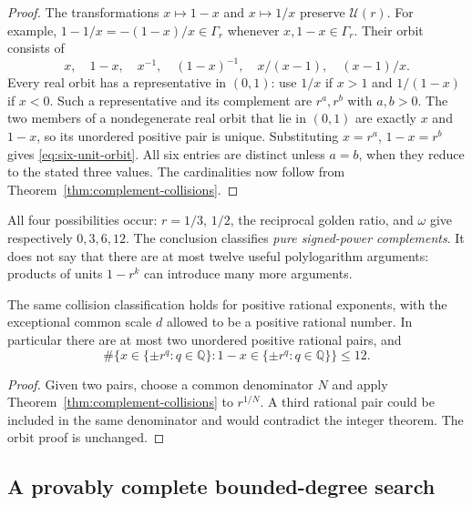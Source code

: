 \begin{proof}
The transformations $x\mapsto1-x$ and $x\mapsto1/x$ preserve
$\mathcal U(r)$.  For example,
$1-1/x=-(1-x)/x\in\Gamma_r$ whenever $x,1-x\in\Gamma_r$.
Their orbit consists of
\[
x,\quad1-x,\quad x^{-1},\quad(1-x)^{-1},
\quad x/(x-1),\quad(x-1)/x.
\]
Every real orbit has a representative in $(0,1)$: use $1/x$ if
$x>1$ and $1/(1-x)$ if $x<0$.  Such a representative and its
complement are $r^a,r^b$ with $a,b>0$.  The two members of a
nondegenerate real orbit that lie in $(0,1)$ are exactly $x$ and
$1-x$, so its unordered positive pair is unique.  Substituting
$x=r^a$, $1-x=r^b$ gives \eqref{eq:six-unit-orbit}.
All six entries are distinct unless $a=b$, when they reduce to
the stated three values.  The cardinalities now follow from
Theorem~\ref{thm:complement-collisions}.
\end{proof}

All four possibilities occur: $r=1/3$, $1/2$, the reciprocal golden
ratio, and $\omega$ give respectively $0,3,6,12$.
The conclusion classifies \emph{pure signed-power complements}.
It does not say that there are at most twelve useful polylogarithm
arguments: products of units $1-r^k$ can introduce many more arguments.

\begin{corollary}
\label{cor:rational-complements}
The same collision classification holds for positive rational
exponents, with the exceptional common scale $d$ allowed to be a
positive rational number.  In particular there are at most two
unordered positive rational pairs, and
\[
\#\{x\in\{\pm r^q:q\in\mathbb Q\}:1-x\in
                          \{\pm r^q:q\in\mathbb Q\}\}\le12.
\]
\end{corollary}

\begin{proof}
Given two pairs, choose a common denominator $N$ and apply
Theorem~\ref{thm:complement-collisions} to $r^{1/N}$.
A third rational pair could be included in the same denominator
and would contradict the integer theorem.  The orbit proof is
unchanged.
\end{proof}

\subsection{A provably complete bounded-degree search}

